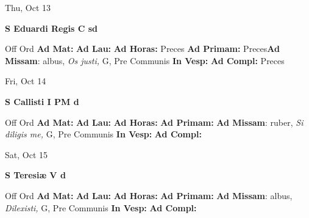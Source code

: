\documentclass[10pt]{memoir}
\begin{document}
\begin{center}
\begin{minipage}{3.5in}
\vspace{2em}
\begin{center}Thu, Oct 13
\end{center}
\textbf{ \large S Eduardi Regis C
\textnormal{\normalsize sd}}

\begin{justify}Off Ord
\textbf{Ad Mat: }
\textbf{Ad Lau: }
\textbf{Ad Horas: }Preces
\textbf{Ad Primam: }Preces\textbf{Ad Missam}: albus, \textit{Os justi,} G, Pre Communis
\textbf{In Vesp: }
\textbf{Ad Compl: }Preces
\end{justify}
\end{minipage}
\end{center}

\begin{center}
\begin{minipage}{3.5in}
\vspace{2em}
\begin{center}Fri, Oct 14
\end{center}
\textbf{ \large S Callisti I PM
\textnormal{\normalsize d}}

\begin{justify}Off Ord
\textbf{Ad Mat: }
\textbf{Ad Lau: }
\textbf{Ad Horas: }
\textbf{Ad Primam: }\textbf{Ad Missam}: ruber, \textit{Si diligis me,} G, Pre Communis
\textbf{In Vesp: }
\textbf{Ad Compl: }
\end{justify}
\end{minipage}
\end{center}

\begin{center}
\begin{minipage}{3.5in}
\vspace{2em}
\begin{center}Sat, Oct 15
\end{center}
\textbf{ \large S Teresiæ V
\textnormal{\normalsize d}}

\begin{justify}Off Ord
\textbf{Ad Mat: }
\textbf{Ad Lau: }
\textbf{Ad Horas: }
\textbf{Ad Primam: }\textbf{Ad Missam}: albus, \textit{Dilexisti,} G, Pre Communis
\textbf{In Vesp: }
\textbf{Ad Compl: }
\end{justify}
\end{minipage}
\end{center}
\end{document}
